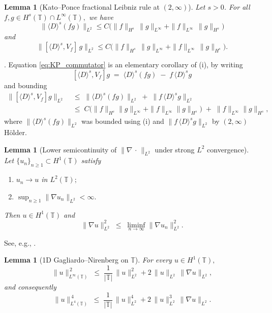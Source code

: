 \documentclass[11pt]{amsart}
\newtheorem{lemma}[theorem]{Lemma}
\theoremstyle{definition}
\newcommand{\T}{\mathbb{T}}
\begin{document}
\begin{lemma}[Kato--Ponce fractional Leibniz rule at $(2,\infty)$]\label{lem:KP}
Let $s>0$. For all $f,g\in H^s(\T)\cap L^\infty(\T),$
we have
\begin{equation}\label{eq:KP}
  \|\langle D\rangle^s(fg)\|_{L^2}
  \le C\bigl(
  \|f\|_{H^s}\,\|g\|_{L^\infty}
  + \|f\|_{L^\infty}\,\|g\|_{H^s}
  \bigr)
\end{equation}
and
\begin{equation}\label{eq:KP_commutator}
  \|[\langle D\rangle^s, V_f]\,g\|_{L^2}
  \le C\bigl(
  \|f\|_{H^s}\,\|g\|_{L^\infty}
  + \|f\|_{L^\infty}\,\|g\|_{H^s}
  \bigr).
\end{equation}
\end{lemma}
. Equation \eqref{eq:KP_commutator} is an elementary corollary of (i), by writing
\[
  [\langle D\rangle^s,V_f]g\;=\;\langle D\rangle^s(fg)\;-\;f\,\langle D\rangle^s g
\]
and bounding 
\[
\begin{aligned}
  \|[\langle D\rangle^s,V_f]g\|_{L^2}
  &\;\le\;\|\langle D\rangle^s(fg)\|_{L^2}\;+\;\|f\,\langle D\rangle^s g\|_{L^2} && \\
  &\;\le\;C\bigl(\|f\|_{H^s}\|g\|_{L^\infty}+\|f\|_{L^\infty}\|g\|_{H^s}\bigr)\;+\;\|f\|_{L^\infty}\|g\|_{H^s}, && 
\end{aligned}
\]
where $\|\langle D\rangle^s(fg)\|_{L^2}$ was bounded using (i) and $\|f\,\langle D\rangle^s g\|_{L^2}$ by  $(2,\infty)$ H\"older.

\begin{lemma}[Lower semicontinuity of $\|\nabla\,\cdot\,\|_{L^2}$ under strong $L^2$ convergence]\label{lem:LSC}
Let $\{u_n\}_{n\ge 1}\subset H^1(\T)$ satisfy
\begin{enumerate}
\item[\textup{(i)}] $u_n\to u$ in $L^2(\T);$
\item[\textup{(ii)}] $\sup_{n\ge 1}\|\nabla u_n\|_{L^2}<\infty.$
\end{enumerate}
Then $u\in H^1(\T)$ and
\begin{equation}\label{eq:LSC}
  \|\nabla u\|_{L^2}^2 \;\le\; \liminf_{n\to\infty}\|\nabla u_n\|_{L^2}^2.
\end{equation}
\end{lemma}
\noindent See, e.g., \cite[Prop.~3.5(iii)]{Brezis2011}.


\begin{lemma}[1D Gagliardo--Nirenberg on $\T$]\label{lem:GN1d}
For every $u\in H^1(\T),$
\begin{equation}\label{eq:Linfty_bound}
  \|u\|_{L^\infty(\T)}^{\,2}
  \;\le\; \frac{1}{|\T|}\,\|u\|_{L^2}^2 + 2\,\|u\|_{L^2}\,\|\nabla u\|_{L^2},
\end{equation}
and consequently
\begin{equation}\label{eq:GN1d}
  \|u\|_{L^4(\T)}^{\,4}
  \;\le\; \frac{1}{|\T|}\,\|u\|_{L^2}^4 + 2\,\|u\|_{L^2}^3\,\|\nabla u\|_{L^2}.
\end{equation}
\end{lemma}
\end{document}
